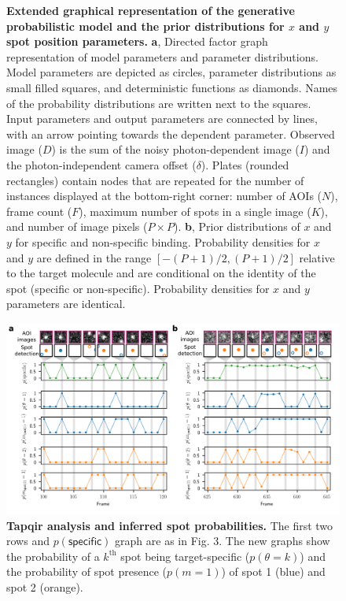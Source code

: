 \begin{figure} [t]
\caption{\textbf{Extended graphical representation of the generative probabilistic model and the prior distributions for $x$ and $y$ spot position parameters.} \textbf{a}, Directed factor graph representation \cite{Bishop2006-oa} of model parameters and parameter distributions. Model parameters are depicted as circles, parameter distributions as small filled squares, and deterministic functions as diamonds. Names of the probability distributions are written next to the squares. Input parameters and output parameters are connected by lines, with an arrow pointing towards the dependent parameter. Observed image ($D$) is the sum of the noisy photon-dependent image ($I$) and the photon-independent camera offset ($\delta$). Plates (rounded rectangles) contain nodes that are repeated for the number of instances displayed at the bottom-right corner: number of AOIs ($N$), frame count ($F$), maximum number of spots in a single image ($K$), and number of image pixels ($P \times P$). \textbf{b}, Prior distributions of $x$ and $y$ for specific and non-specific binding. Probability densities for $x$ and $y$ are defined in the range $\left[ -(P+1)/2, (P+1)/2 \right] $ relative to the target molecule and are conditional on the identity of the spot (specific or non-specific).  Probability densities for $x$ and $y$ parameters are identical. }
\end{figure}
\clearpage

\begin{figure}[h]
\centering
\includegraphics[width=\textwidth]{extended-data/figure2/figure2.png}
\caption{\textbf{Tapqir analysis and inferred spot probabilities.} The first two rows and $p(\mathsf{specific})$ graph are as in Fig. 3. The new graphs show the probability of a $k^\mathrm{th}$ spot being target-specific ($p(\theta=k)$) and the probability of spot presence ($p(m=1)$) of spot 1 (blue) and spot 2 (orange).  }
\end{figure}
\pagebreak


